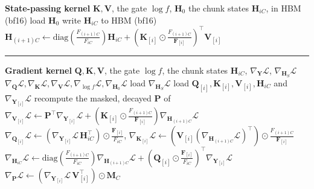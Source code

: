 \caption{Linear-attention backward: the state-passing kernel walks the sequence forward, the gradient kernel walks it in reverse. One Pallas program per batch element; decay ratios of $F$ as in .}
\begin{algorithmic}
\Statex \textbf{State-passing kernel}
\REQUIRE $\mathbf{K}, \mathbf{V}$, the gate $\log f$, $\mathbf{H}_0$
\ENSURE the chunk states $\mathbf{H}_{iC}$, in HBM (bf16)
\STATE load $\mathbf{H}_0$
\STATE write $\mathbf{H}_{iC}$ to HBM (bf16) 
\STATE $\mathbf{H}_{(i+1)C} \gets \mathrm{diag}\!\left(\frac{F_{(i+1)C}}{F_{iC}}\right) \mathbf{H}_{iC} + \left(\mathbf{K}_{[i]} \odot \frac{F_{(i+1)C}}{\boldsymbol F_{[i]}}\right)^\top \mathbf{V}_{[i]}$
\ENDFOR
\hrule
\Statex \textbf{Gradient kernel}
\REQUIRE $\mathbf{Q}, \mathbf{K}, \mathbf{V}$, the gate $\log f$, the chunk states $\mathbf{H}_{iC}$, $\nabla_{\mathbf{Y}}\mathcal{L}$, $\nabla_{\mathbf{H}_S}\mathcal{L}$
\ENSURE $\nabla_{\mathbf{Q}}\mathcal{L}, \nabla_{\mathbf{K}}\mathcal{L}, \nabla_{\mathbf{V}}\mathcal{L}, \nabla_{\log f}\mathcal{L}, \nabla_{\mathbf{H}_0}\mathcal{L}$
\STATE load $\nabla_{\mathbf{H}_S}\mathcal{L}$ 
\STATE load $\mathbf{Q}_{[i]}, \mathbf{K}_{[i]}, \mathbf{V}_{[i]}, \mathbf{H}_{iC}$ and $\nabla_{\mathbf{Y}_{[i]}}\mathcal{L}$
\STATE recompute the masked, decayed $\mathbf{P}$ of 
\STATE $\nabla_{\mathbf{V}_{[i]}}\mathcal{L} \gets \mathbf{P}^\top \nabla_{\mathbf{Y}_{[i]}}\mathcal{L} + \left(\mathbf{K}_{[i]} \odot \frac{F_{(i+1)C}}{\boldsymbol F_{[i]}}\right) \nabla_{\mathbf{H}_{(i+1)C}}\mathcal{L}$
\STATE $\nabla_{\mathbf{Q}_{[i]}}\mathcal{L} \gets \left(\nabla_{\mathbf{Y}_{[i]}}\mathcal{L}\, \mathbf{H}_{iC}^\top\right) \odot \frac{\boldsymbol F_{[i]}}{F_{iC}}$, $\nabla_{\mathbf{K}_{[i]}}\mathcal{L} \gets \left(\mathbf{V}_{[i]} \left(\nabla_{\mathbf{H}_{(i+1)C}}\mathcal{L}\right)^\top\right) \odot \frac{F_{(i+1)C}}{\boldsymbol F_{[i]}}$ 
\STATE $\nabla_{\mathbf{H}_{iC}}\mathcal{L} \gets \mathrm{diag}\!\left(\frac{F_{(i+1)C}}{F_{iC}}\right) \nabla_{\mathbf{H}_{(i+1)C}}\mathcal{L} + \left(\mathbf{Q}_{[i]} \odot \frac{\boldsymbol F_{[i]}}{F_{iC}}\right)^\top \nabla_{\mathbf{Y}_{[i]}}\mathcal{L}$ 
\STATE $\nabla_{\mathbf{P}}\mathcal{L} \gets \left(\nabla_{\mathbf{Y}_{[i]}}\mathcal{L}\, \mathbf{V}_{[i]}^\top\right) \odot \mathbf{M}_C$ 

\end{algorithmic}
